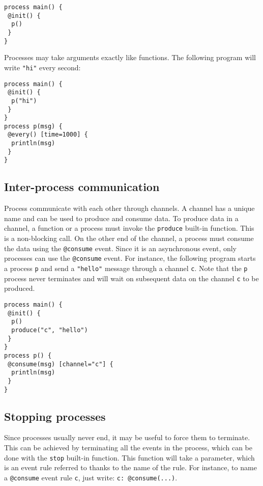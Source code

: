 \documentclass[11pt]{report}
\begin{document}
\begin{lstlisting}
process main() {
 @init() {
  p()
 }
}
\end{lstlisting}

Processes may take arguments exactly like functions. The following program will write \texttt{"hi"} every second:

\begin{lstlisting}
process main() {
 @init() {
  p("hi")
 }
}
process p(msg) {
 @every() [time=1000] {
  println(msg)
 }
}
\end{lstlisting}

\subsection{Inter-process communication\label{sec:communication}}

Process communicate with each other through channels. A channel has a unique name and can be used to produce and consume data. To produce data in a channel, a function or a process must invoke the \texttt{produce} built-in function. This is a non-blocking call. On the other end of the channel, a process must consume the data using the  \texttt{@consume} event. Since it is an asynchronous event, only processes can use the  \texttt{@consume} event. For instance, the following program starts a process \texttt{p} and send a \texttt{"hello"} message through a channel \texttt{c}. Note that the  \texttt{p} process never terminates and will wait on subsequent data on the channel \texttt{c} to be produced.

\begin{lstlisting}
process main() {
 @init() {
  p()
  produce("c", "hello")
 }
}
process p() {
 @consume(msg) [channel="c"] {
  println(msg)
 }
}
\end{lstlisting}

\subsection{Stopping processes}

Since processes usually never end, it may be useful to force them to terminate. This can be achieved by terminating all the events in the process, which can be done with the \texttt{stop} built-in function. This function will take a parameter, which is an event rule referred to thanks to the name of the rule. For instance, to name a \texttt{@consume} event rule \texttt{c}, just write: \texttt{c: @consume(...)}. 
\end{document}
